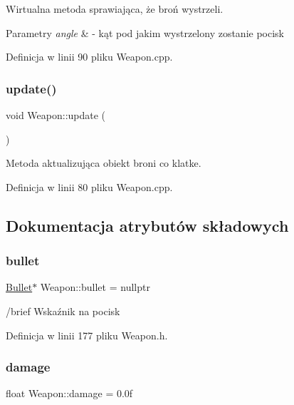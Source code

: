 Wirtualna metoda sprawiająca, że broń wystrzeli. 


\begin{DoxyParams}{Parametry}
{\em angle} & -\/ kąt pod jakim wystrzelony zostanie pocisk \\
\hline
\end{DoxyParams}


Definicja w linii 90 pliku Weapon.\+cpp.

\mbox{\label{class_weapon_a1b3f76c5275b67f0bb8073157a27e736}} 
\subsubsection{\texorpdfstring{update()}{update()}}
{\footnotesize\ttfamily void Weapon\+::update (\begin{DoxyParamCaption}{ }\end{DoxyParamCaption})}



Metoda aktualizująca obiekt broni co klatke. 



Definicja w linii 80 pliku Weapon.\+cpp.



\subsection{Dokumentacja atrybutów składowych}
\mbox{\label{class_weapon_a799874e40f4d2235ffa259eb46674fe5}} 
\subsubsection{\texorpdfstring{bullet}{bullet}}
{\footnotesize\ttfamily \mbox{\hyperlink{class_bullet}{Bullet}}$\ast$ Weapon\+::bullet = nullptr\hspace{0.3cm}{\ttfamily [protected]}}

/brief Wskaźnik na pocisk 

Definicja w linii 177 pliku Weapon.\+h.

\mbox{\label{class_weapon_a5fd71198c35ebc63e9d5c4fc486d2510}} 
\subsubsection{\texorpdfstring{damage}{damage}}
{\footnotesize\ttfamily float Weapon\+::damage = 0.\+0f\hspace{0.3cm}{\ttfamily [protected]}}



